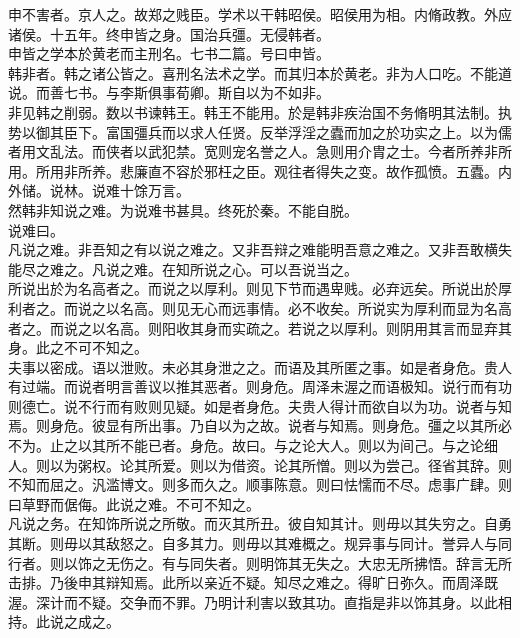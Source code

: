 \documentclass{zhvt-classic}
\begin{document}
\hspace*{2em}申不害者。京人之。故郑之贱臣。学术以干韩昭侯。昭侯用为相。内脩政教。外应诸侯。十五年。终申皆之身。国治兵彊。无侵韩者。\\
\hspace*{2em}申皆之学本於黄老而主刑名。七书二篇。号曰申皆。\\
\hspace*{2em}韩非者。韩之诸公皆之。喜刑名法术之学。而其归本於黄老。非为人口吃。不能道说。而善七书。与李斯俱事荀卿。斯自以为不如非。\\
\hspace*{2em}非见韩之削弱。数以书谏韩王。韩王不能用。於是韩非疾治国不务脩明其法制。执势以御其臣下。富国彊兵而以求人任贤。反举浮淫之蠹而加之於功实之上。以为儒者用文乱法。而侠者以武犯禁。宽则宠名誉之人。急则用介胄之士。今者所养非所用。所用非所养。悲廉直不容於邪枉之臣。观往者得失之变。故作孤愤。五蠹。内外储。说林。说难十馀万言。\\
\hspace*{2em}然韩非知说之难。为说难书甚具。终死於秦。不能自脱。\\
\hspace*{2em}说难曰。\\
\hspace*{2em}凡说之难。非吾知之有以说之难之。又非吾辩之难能明吾意之难之。又非吾敢横失能尽之难之。凡说之难。在知所说之心。可以吾说当之。\\
\hspace*{2em}所说出於为名高者之。而说之以厚利。则见下节而遇卑贱。必弃远矣。所说出於厚利者之。而说之以名高。则见无心而远事情。必不收矣。所说实为厚利而显为名高者之。而说之以名高。则阳收其身而实疏之。若说之以厚利。则阴用其言而显弃其身。此之不可不知之。\\
\hspace*{2em}夫事以密成。语以泄败。未必其身泄之之。而语及其所匿之事。如是者身危。贵人有过端。而说者明言善议以推其恶者。则身危。周泽未渥之而语极知。说行而有功则德亡。说不行而有败则见疑。如是者身危。夫贵人得计而欲自以为功。说者与知焉。则身危。彼显有所出事。乃自以为之故。说者与知焉。则身危。彊之以其所必不为。止之以其所不能已者。身危。故曰。与之论大人。则以为间己。与之论细人。则以为粥权。论其所爱。则以为借资。论其所憎。则以为尝己。径省其辞。则不知而屈之。汎滥博文。则多而久之。顺事陈意。则曰怯懦而不尽。虑事广肆。则曰草野而倨侮。此说之难。不可不知之。\\
\hspace*{2em}凡说之务。在知饰所说之所敬。而灭其所丑。彼自知其计。则毋以其失穷之。自勇其断。则毋以其敌怒之。自多其力。则毋以其难概之。规异事与同计。誉异人与同行者。则以饰之无伤之。有与同失者。则明饰其无失之。大忠无所拂悟。辞言无所击排。乃後申其辩知焉。此所以亲近不疑。知尽之难之。得旷日弥久。而周泽既渥。深计而不疑。交争而不罪。乃明计利害以致其功。直指是非以饰其身。以此相持。此说之成之。\\
\end{document}
